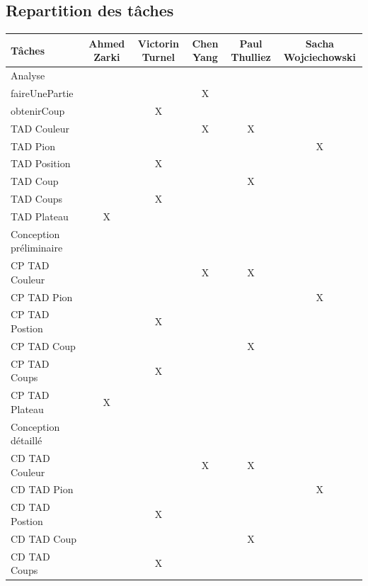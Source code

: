 \documentclass{article}
\begin{document}
\subsection{Repartition des tâches}
\begin{tabular}{|l|c|c|c|c|c|}
  \hline
  Tâches & Ahmed Zarki & Victorin Turnel & Chen Yang & Paul Thulliez & Sacha Wojciechowski \\
  \hline
  Analyse \\
  \hline
  faireUnePartie & & & X & & \\
  obtenirCoup & & X & & & \\
  TAD Couleur  & & & X & X &   \\
  TAD Pion & & & & & X \\
  TAD Position & & X & & &   \\
  TAD Coup & & & & X & \\
  TAD Coups & & X  & & &  \\
  TAD Plateau & X & & & & \\
  \hline
  Conception préliminaire \\
  \hline
  CP TAD Couleur & & & X & X & \\
  CP TAD Pion & & & & & X \\
  CP TAD Postion & & X & & &  \\
  CP TAD Coup & & & & X & \\              
  CP TAD Coups & & X & & & \\             
  CP TAD Plateau & X & & & & \\
  \hline
  Conception détaillé \\
  \hline
  CD TAD Couleur & & & X & X & \\                                                                                                                                                                       
  CD TAD Pion & & & & & X \\                                                                                   
  CD TAD Postion & & X & & &  \\                                                                                                                                                                         
  CD TAD Coup & & & & X & \\                                                                                                                                                                             
  CD TAD Coups & & X & & & \\                                                                                                                                                                            

\end{tabular}
\end{document}

